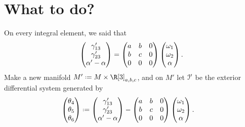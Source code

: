 \section{What to do?}
On every integral element, we said that
\[
\begin{pmatrix} 
\gamma'_{13} \\
\gamma'_{23} \\
\alpha'-\alpha
\end{pmatrix}
=
\begin{pmatrix}
a & b & 0\\
b & c & 0\\
0 & 0 & 0
\end{pmatrix} 
\begin{pmatrix}
\omega_1 \\
\omega_2 \\
\alpha
\end{pmatrix}.
\]
Make a new manifold \(M' \defeq M \times \R[3]_{a,b,c}\), and on \(M'\) let \(\mathcal{I}'\) be the exterior differential system generated by
\begin{align*}
\begin{pmatrix}
\theta_4 \\
\theta_5 \\
\theta_6 
\end{pmatrix}
&\defeq 
\begin{pmatrix}
\qc_{13} \\
\qc_{23} \\
\otalpha-\alpha
\end{pmatrix}
-
\begin{pmatrix}
a & b & 0 \\
b & c & 0 \\
0 & 0 & 0
\end{pmatrix}
\begin{pmatrix}
\pf_1 \\
\pf_2 \\
\alpha
\end{pmatrix}.
\end{align*}


